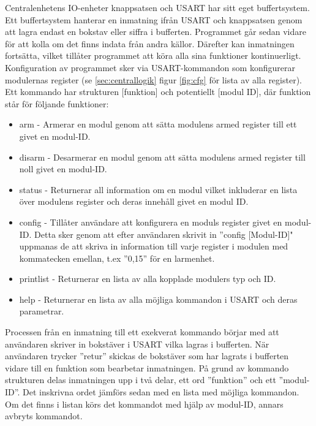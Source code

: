 

Centralenhetens IO-enheter knappsatsen och USART har sitt eget buffertsystem. Ett buffertsystem hanterar en inmatning ifrån USART och knappsatsen genom att lagra endast en bokstav eller siffra i bufferten. Programmet går sedan vidare för att kolla om det finns indata från andra källor. Därefter kan inmatningen fortsätta, vilket tillåter programmet att köra alla sina funktioner kontinuerligt. \\

Konfiguration av programmet sker via USART-kommandon som konfigurerar modulernas register (se \ref{sec:centrallogik} figur \ref{fig:cfg} för lista av alla register). Ett kommando har strukturen [funktion] och potentiellt [modul ID], där funktion står för följande funktioner: 
\begin{itemize}
    \item arm - Armerar en modul genom att sätta modulens armed register till ett givet en modul-ID.
    \item disarm - Desarmerar en modul genom att sätta modulens armed register till noll givet en modul-ID.
    \item status - Returnerar all information om en modul vilket inkluderar en lista över modulens register och deras innehåll givet en modul ID.
    \item config - Tillåter användare att konfigurera en moduls register givet en modul-ID. Detta sker genom att efter användaren skrivit in ''config [Modul-ID]" uppmanas de att skriva in information till varje register i modulen med kommatecken emellan, t.ex ''0,15'' för en larmenhet. 
    \item printlist - Returnerar en lista av alla kopplade modulers typ och ID.
    \item help - Returnerar en lista av alla möjliga kommandon i USART och deras parametrar.
\end{itemize}

Processen från en inmatning till ett exekverat kommando börjar med att användaren skriver in bokstäver i USART vilka lagras i bufferten. När användaren trycker ''retur'' skickas de bokstäver som har lagrats i bufferten vidare till en funktion som bearbetar inmatningen. På grund av kommando strukturen delas inmatningen upp i två delar, ett ord ''funktion'' och ett ''modul-ID''. Det inskrivna ordet jämförs sedan med en lista med möjliga kommandon. Om det finns i listan körs det kommandot med hjälp av modul-ID, annars avbryts kommandot. \\

